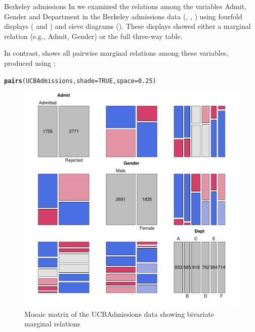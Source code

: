 \documentclass[11pt]{book}\usepackage[]{graphicx}\usepackage[]{color}
\makeatletter
\newcommand{\hlnum}[1]{\textcolor[rgb]{0.686,0.059,0.569}{#1}}%
\newcommand{\hlstd}[1]{\textcolor[rgb]{0.345,0.345,0.345}{#1}}%
\newcommand{\hlkwc}[1]{\textcolor[rgb]{0.333,0.667,0.333}{#1}}%
\newcommand{\hlkwd}[1]{\textcolor[rgb]{0.737,0.353,0.396}{\textbf{#1}}}%
\newenvironment{kframe}{%
 \def\at@end@of@kframe{}%
 \ifinner\ifhmode%
  \def\at@end@of@kframe{\end{minipage}}%
  \begin{minipage}{\columnwidth}%
 \fi\fi%
 \def\FrameCommand##1{\hskip\@totalleftmargin \hskip-\fboxsep
 \colorbox{shadecolor}{##1}\hskip-\fboxsep
     \hskip-\linewidth \hskip-\@totalleftmargin \hskip\columnwidth}%
 \MakeFramed {\advance\hsize-\width
   \@totalleftmargin\z@ \linewidth\hsize
   \@setminipage}}%
 {\par\unskip\endMakeFramed%
 \at@end@of@kframe}
\newenvironment{knitrout}{}{} %
\renewenvironment{knitrout}{\small\renewcommand{\baselinestretch}{.85}}{} %
\makeatother
\begin{document}
\begin{Example}[berkeley4]{Berkeley admissions}
In  we examined the
relations among the variables Admit, Gender and Department in the Berkeley
admissions data (, , ) 
using fourfold displays
( and )
and sieve diagrams ().
These displays showed either a marginal relation (e.g., Admit, Gender)
or the full three-way table.

In contrast,  shows all pairwise marginal
relations among these variables, produced using :
\begin{knitrout}
\color{fgcolor}\begin{kframe}
\begin{alltt}
\hlkwd{pairs}\hlstd{(UCBAdmissions,} \hlkwc{shade} \hlstd{=} \hlnum{TRUE}\hlstd{,} \hlkwc{space}\hlstd{=}\hlnum{0.25}\hlstd{)}
\end{alltt}
\end{kframe}\begin{figure}[!htb]


\centerline{\includegraphics[width=.8\textwidth]{ch05/fig/berk-pairs1} }

\caption[Mosaic matrix of the UCBAdmissions data showing bivariate marginal relations]{Mosaic matrix of the UCBAdmissions data showing bivariate marginal relations\label{fig:berk-pairs1}}
\end{figure}



\end{knitrout}
\end{Example}
\end{document}
